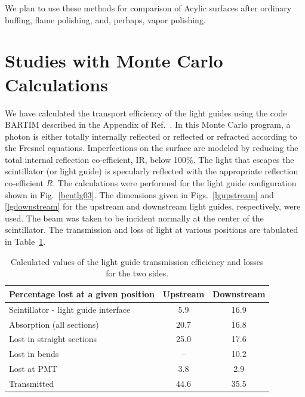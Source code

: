 We plan to use these methods for comparison of Acylic surfaces after  
ordinary buffing, flame polishing, and, perhaps, vapor polishing.

\section{Studies with Monte Carlo Calculations}
\label{mutchler}

We have calculated the transport efficiency of the light guides using the 
code BARTIM described in the Appendix of Ref.~\cite{mutch}.  In this 
Monte Carlo program, a photon is either totally internally reflected or 
reflected or refracted according to the Fresnel equations.  Imperfections 
on the surface are modeled by reducing the total internal reflection 
co-efficient, IR, below 100\%.  The light that escapes the scintillator (or 
light guide) is specularly reflected with the appropriate reflection 
co-efficient $R$.  The calculations were performed for the light guide 
configuration shown in Fig.~\ref{bentlg03}.  The dimensions given in 
Figs.~\ref{lgupstream} and \ref{lgdownstream} for the upstream and downstream 
light guides, respectively, were used.  The beam was taken to be incident 
normally at the center of the scintillator.  The transmission and loss of 
light at various positions are tabulated in Table~\ref{mud1}.

\begin{table} [htbp]
\begin{center}
\begin{tabular}{|l|c|c|} \hline
Percentage lost at a given position  & Upstream & Downstream \\ \hline
Scintillator - light guide interface & 5.9      & 16.9       \\ \hline 
Absorption (all sections)            & 20.7	& 16.8 	     \\ \hline
Lost in straight sections  	     & 25.0	& 17.6 	     \\ \hline
Lost in bends  	                     & --	& 10.2       \\ \hline
Lost at PMT  	                     & 3.8 	& 2.9        \\ \hline \hline 
Transmitted  	                     & 44.6	& 35.5 	     \\ \hline
\end{tabular}
\caption{\small{Calculated values of the light guide transmission efficiency 
and losses for the two sides.}}
\label{mud1}
\end{center}
\end{table}

